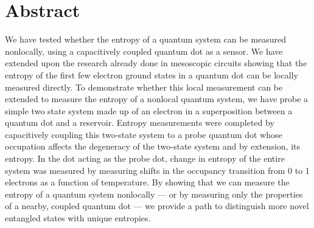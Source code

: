 
\chapter{Abstract}

We have tested whether the entropy of a quantum system can be measured nonlocally, using a capacitively coupled quantum dot as a sensor. We have extended upon the research already done in mesoscopic circuits showing that the entropy of the first few electron ground states in a quantum dot can be locally measured directly. To demonstrate whether this local measurement can be extended to measure the entropy of a nonlocal quantum system, we have probe a simple two state system made up of an electron in a superposition between a quantum dot and a reservoir. Entropy measurements were completed by capacitively coupling this two-state system to a probe quantum dot whose occupation affects the degeneracy of the two-state system and by extension, its entropy. In the dot acting as the probe dot, change in entropy of the entire system was measured by measuring shifts in the occupancy transition from 0 to 1 electrons as a function of temperature. By showing that we can measure the entropy of a quantum system nonlocally — or by measuring only the properties of a nearby, coupled quantum dot — we provide a path to distinguish more novel entangled states with unique entropies.

